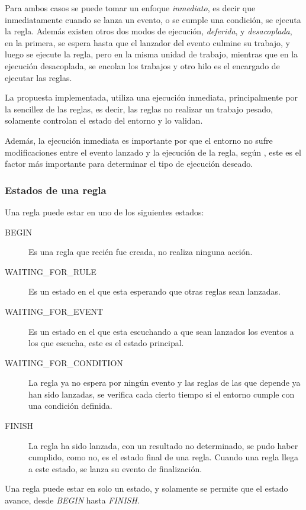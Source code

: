 Para ambos casos se puede tomar un enfoque \emph{inmediato}, es decir que
inmediatamente cuando se lanza un evento, o se cumple una condición, se ejecuta
la regla. Además existen otros dos modos de ejecución, \emph{deferida}, y
\emph{desacoplada}, en la primera, se espera hasta que el lanzador del evento
culmine su trabajo, y luego se ejecute la regla, pero en la misma unidad de
trabajo, mientras que en la ejecución desacoplada, se encolan los trabajos y
otro hilo es el encargado de ejecutar las reglas.

La propuesta implementada, utiliza una ejecución inmediata, principalmente por
la sencillez de las reglas, es decir, las reglas no realizar un trabajo pesado,
solamente controlan el estado del entorno y lo validan.

Además, la ejecución inmediata es importante por que el entorno no sufre
modificaciones entre el evento lanzado y la ejecución de la regla, según
\cite{bailey2004event}, este es el factor más importante para determinar el tipo
de ejecución deseado.



\subsubsection{Estados de una regla}

Una regla puede estar en uno de los siguientes estados:

\begin{description}
\item[BEGIN] Es una regla que recién fue creada, no realiza ninguna
	acción.
\item[WAITING\_FOR\_RULE] Es un estado en el que esta esperando que otras reglas
	sean lanzadas.
\item[WAITING\_FOR\_EVENT] Es un estado en el que esta escuchando a que sean
	lanzados los eventos a los que escucha, este es el estado principal.
\item[WAITING\_FOR\_CONDITION] La regla ya no espera por ningún evento y las
	reglas de las que depende ya han sido lanzadas, se verifica cada cierto
	tiempo si el entorno cumple con una condición definida.
\item[FINISH] La regla ha sido lanzada, con un resultado no determinado, se pudo
	haber cumplido, como no, es el estado final de una regla. Cuando una
	regla llega a este estado, se lanza su evento de finalización.
\end{description}

Una regla puede estar en solo un estado, y solamente se permite que el estado
avance, desde \emph{BEGIN} hasta \emph{FINISH}.

